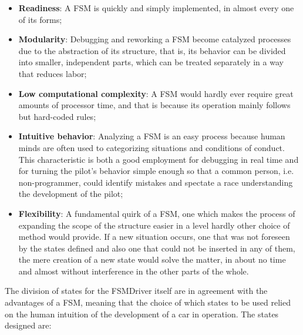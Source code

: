 \begin{itemize}
	\item \textbf{Readiness}: A FSM is quickly and simply implemented, in almost every one of its forms;
	
	\item \textbf{Modularity}: Debugging and reworking a FSM become catalyzed processes due to the abstraction of its structure, that is, its behavior can be divided into smaller, independent parts, which can be treated separately in a way that reduces labor;
	
	\item \textbf{Low computational complexity}: A FSM would hardly ever require great amounts of processor time, and that is because its operation mainly follows but hard-coded rules;
	
	\item \textbf{Intuitive behavior}: Analyzing a FSM is an easy process because human minds are often used to categorizing situations and conditions of conduct. This characteristic is both a good employment for debugging in real time and for turning the pilot's behavior simple enough so that a common person, i.e. non-programmer, could identify mistakes and spectate a race understanding the development of the pilot;
	
	\item \textbf{Flexibility}: A fundamental quirk of a FSM, one which makes the process of expanding the scope of the structure easier in a level hardly other choice of method would provide. If a new situation occurs, one that was not foreseen by the states defined and also one that could not be inserted in any of them, the mere creation of a new state would solve the matter, in about no time and almost without interference in the other parts of the whole.
\end{itemize}

The division of states for the FSMDriver itself are in agreement with the advantages of a FSM, meaning that the choice of which states to be used relied on the human intuition of the development of a car in operation. The states designed are:


